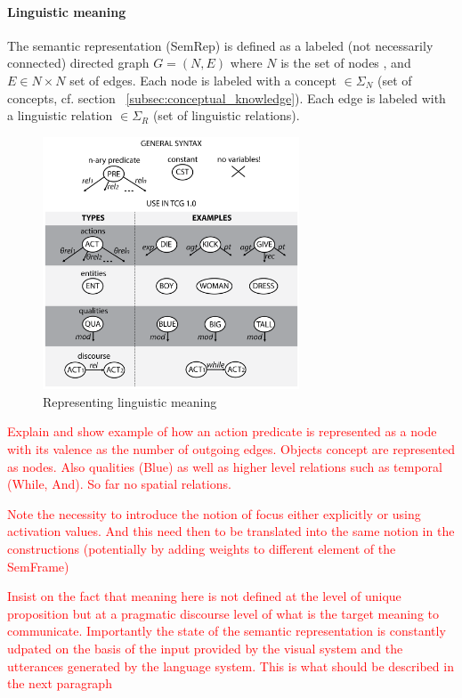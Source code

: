 \documentclass{article}
\newcommand\todo[1]{\textcolor{red}{#1}}
\begin{document}
\paragraph{Linguistic meaning}
The semantic representation (SemRep) is defined as a labeled (not necessarily connected) directed graph $G = (N,E)$ where $N$ is the set of nodes , and $E \in N \times N $ set of edges. Each node is labeled with  a concept $ \in \Sigma_N $ (set of concepts, cf. section ~\ref{subsec:conceptual_knowledge}). Each edge is labeled with a linguistic relation $ \in \Sigma_R $ (set of linguistic relations).

\begin{figure}[H]
	\centering
	\includegraphics[width=3.0in]{Figures/SemRep_def.png}
	\caption{Representing linguistic meaning}
	\label{fig:semrep_def}
\end{figure}

\todo{Explain and show example of how an action predicate is represented as a node with its valence as the number of outgoing edges. Objects concept are represented as nodes. Also qualities (Blue) as well as higher level relations such as temporal (While, And). So far no spatial relations.}

\todo{Note the necessity to introduce the notion of focus either explicitly or using activation values. And this need then to be translated into the same notion in the constructions (potentially by adding weights to different element of the SemFrame)}

\todo{Insist on the fact that meaning here is not defined at the level of unique proposition but at a pragmatic discourse level of what is the target meaning to communicate. Importantly the state of the semantic representation is constantly udpated on the basis of the input provided by the visual system and the utterances generated by the language system. This is what should be described in the next paragraph}
\end{document}

